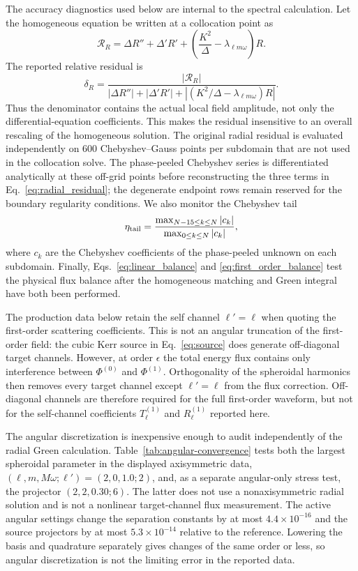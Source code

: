 \documentclass[aps,prd,twocolumn,10pt,nofootinbib,superscriptaddress,floatfix]{revtex4-2}
\newcommand{\DeltaK}{\Delta}
\newcommand{\Res}{\mathcal R}
\begin{document}
The accuracy diagnostics used below are internal to the spectral calculation.
Let the homogeneous equation be written at a collocation point as
\begin{equation}
\Res_R=\DeltaK R''+\DeltaK'R'
+\left(\frac{K^2}{\DeltaK}-\lambda_{\ell m\omega}\right)R .
\end{equation}
The reported relative residual is
\begin{equation}
\delta_R=
\frac{|\Res_R|}
{|\DeltaK R''|+|\DeltaK'R'|
+\left|\left(K^2/\DeltaK-\lambda_{\ell m\omega}\right)R\right|}.
\label{eq:radial_residual}
\end{equation}
Thus the denominator contains the actual local field amplitude, not only the
differential-equation coefficients.  This makes the residual insensitive to an
overall rescaling of the homogeneous solution.  The original radial residual
is evaluated independently on 600 Chebyshev--Gauss points per subdomain that
are not used in the collocation solve.  The phase-peeled Chebyshev series is
differentiated analytically at these off-grid points before reconstructing the
three terms in Eq.~\eqref{eq:radial_residual}; the degenerate endpoint rows
remain reserved for the boundary regularity conditions.  We also monitor the Chebyshev
tail
\begin{equation}
\eta_{\rm tail}=
\frac{\max_{N-15\le k\le N}|c_k|}
{\max_{0\le k\le N}|c_k|},
\end{equation}
where $c_k$ are the Chebyshev coefficients of the phase-peeled unknown on each
subdomain.  Finally, Eqs.~\eqref{eq:linear_balance} and
\eqref{eq:first_order_balance} test the physical flux balance after the
homogeneous matching and Green integral have both been performed.

The production data below retain the self channel $\ell'=\ell$ when quoting
the first-order scattering coefficients.  This is not an angular truncation of
the first-order field: the cubic Kerr source in Eq.~\eqref{eq:source} does
generate off-diagonal target channels.  However, at order $\epsilon$ the total
energy flux contains only interference between $\Phi^{(0)}$ and
$\Phi^{(1)}$.  Orthogonality of the spheroidal harmonics then removes every
target channel except $\ell'=\ell$ from the flux correction.  Off-diagonal
channels are therefore required for the full first-order waveform, but not for
the self-channel coefficients $T_\ell^{(1)}$ and $R_\ell^{(1)}$ reported here.

The angular discretization is inexpensive enough to audit independently of the
radial Green calculation.  Table~\ref{tab:angular-convergence} tests both the
largest spheroidal parameter in the displayed axisymmetric data,
$(\ell,m,M\omega;\ell')=(2,0,1.0;2)$, and, as a separate angular-only stress test, the
projector $(2,2,0.30;6)$.  The latter does not use a nonaxisymmetric
radial solution and is not a nonlinear target-channel flux measurement.  The active angular settings change
the separation constants by at most $4.4\times10^{-16}$ and the source
projectors by at most $5.3\times10^{-14}$ relative to the reference.  Lowering
the basis and quadrature separately gives changes of the same order or less,
so angular discretization is not the limiting error in the reported data.
\end{document}
